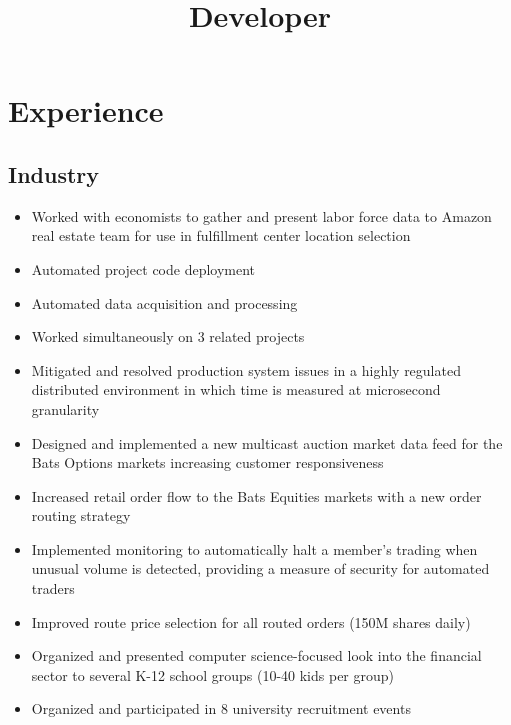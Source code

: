 \documentclass[10pt,a4paper,sans]{moderncv}        %
\title{Developer}
\begin{document}
\makecvtitle

\section{Experience}
\subsection{Industry}
\begin{itemize}
\item Worked with economists to gather and present labor force data to Amazon real estate team for use in fulfillment center location selection
\item Automated project code deployment
\item Automated data acquisition and processing
\item Worked simultaneously on 3 related projects
\makenewline
\makenewline
\end{itemize}
\begin{itemize}
\item Mitigated and resolved production system issues in a highly regulated distributed environment in which time is measured at microsecond granularity
\item Designed and implemented a new multicast auction market data feed for the Bats Options markets increasing customer responsiveness
\item Increased retail order flow to the Bats Equities markets with a new order routing strategy
\item Implemented monitoring to automatically halt a member's trading when unusual volume is detected, providing a measure of security for automated traders
\item Improved route price selection for all routed orders (150M shares daily)
\item Organized and presented computer science-focused look into the financial sector to several K-12 school groups (10-40 kids per group)
\item Organized and participated in 8 university recruitment events

\end{itemize}
\end{document}
